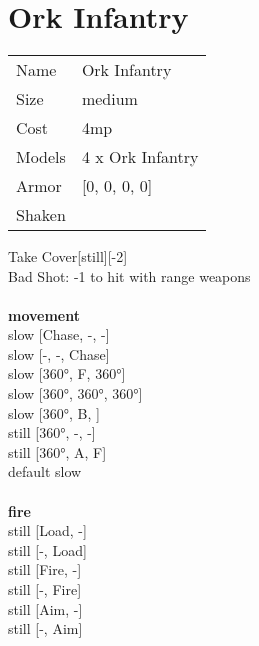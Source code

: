 \ \\

\ \\
 
\ \\













\clearpage

\section{ Ork Infantry }

\begin{tabular}{ll}
  Name & Ork Infantry \\
  Size & medium\\
  Cost & 4mp\\
  Models & 4 x Ork Infantry\\
  Armor & [0, 0, 0, 0]\\
  Shaken & \\
\end{tabular}

\noindent Take Cover[still][-2]\\ 
Bad Shot: -1 to hit with range weapons\\ 


\ \\ {\bf movement } \\
slow [Chase, -, -] \\
slow [-, -, Chase] \\
slow [360°, F, 360°] \\
slow [360°, 360°, 360°] \\
slow [360°, B, ] \\
still [360°, -, -] \\
still [360°, A, F] \\
default slow \\
\ \\ {\bf fire } \\
still [Load, -] \\
still [-, Load] \\
still [Fire, -] \\
still [-, Fire] \\
still [Aim, -] \\
still [-, Aim] \\



